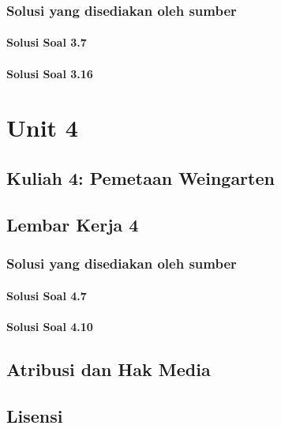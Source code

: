 \documentclass[11pt,a4paper,oneside]{book}
\begin{document}
\section*{Solusi yang disediakan oleh sumber}
\subsection*{Solusi Soal 3.7}

\subsection*{Solusi Soal 3.16}


\part{Unit 4}
\chapter[Kuliah 4]{Kuliah 4: Pemetaan Weingarten}


\chapter{Lembar Kerja 4}


\section*{Solusi yang disediakan oleh sumber}
\subsection*{Solusi Soal 4.7}

\subsection*{Solusi Soal 4.10}


\backmatter
\listoffigures
\chapter*{Atribusi dan Hak Media}




\chapter*{Lisensi}
\Lizenztext
\end{document}
